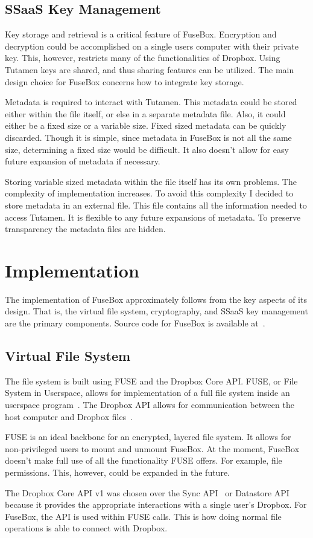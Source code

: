\documentclass[11pt,twocolumn,letterpaper]{article}
\newcommand{\appname}{FuseBox }
\newcommand{\appnameWOspace}{FuseBox}
\newcommand{\custos}{Tutamen }
\newcommand{\custosWOspace}{Tutamen}
\begin{document}
\subsection{SSaaS Key Management}
\label{sec:keystorage}
Key storage and retrieval is a critical feature of \appnameWOspace. 
Encryption and decryption could be accomplished on a single users
computer with their private key. This, however, restricts many of the
functionalities of Dropbox. Using \custos keys are shared, and thus 
sharing features can be utilized. The main design choice for \appname
concerns how to integrate key storage.  
\par Metadata is required to interact with \custosWOspace. This
metadata could be stored either within the file itself, or else in a
separate metadata file. Also, it could either be a fixed size or a
variable size. Fixed sized metadata can be quickly discarded. Though
it is simple, since metadata in \appname is not all the same size,
determining a fixed size would be difficult. It also doesn't allow for
easy future expansion of metadata if necessary. 
\par Storing variable sized metadata within the file itself has its
own problems. The complexity of implementation increases. To avoid
this complexity I decided to store metadata in an external file. This
file contains all the information needed to access \custosWOspace. It
is flexible to any future expansions of metadata. 
To preserve transparency the metadata files are hidden. 

\section{Implementation}
\label{sec:implementation}
The implementation of \appname approximately follows from the key aspects
of its design. That is, the virtual file system, cryptography, and
SSaaS key management
are the primary components. Source code for \appname is available at~\cite{FuseBox}.

\subsection{Virtual File System}
\label{sec:fsimp}
The file system is built using FUSE and the Dropbox Core
API. FUSE, or File System in Userspace, allows for implementation of a
full file system inside an userspace program~\cite{fuse}. The Dropbox
API allows for communication between the host computer and Dropbox
files~\cite{dropboxcore}.
\par FUSE is an ideal backbone for an encrypted, layered file system. It allows
for non-privileged users to mount and unmount \appnameWOspace. At the
moment, \appname doesn't make full use of all the functionality FUSE
offers. For example, file permissions. This, however, could be expanded in the future. 
\par The Dropbox Core API v1 was chosen over the Sync API~\cite{dropboxsync} or Datastore
API~\cite{dropboxdatastore} because it provides the appropriate interactions with a single
user's Dropbox. For \appnameWOspace, the API is used within FUSE
calls. This is how doing normal file operations is able to connect
with Dropbox. 
\end{document}
